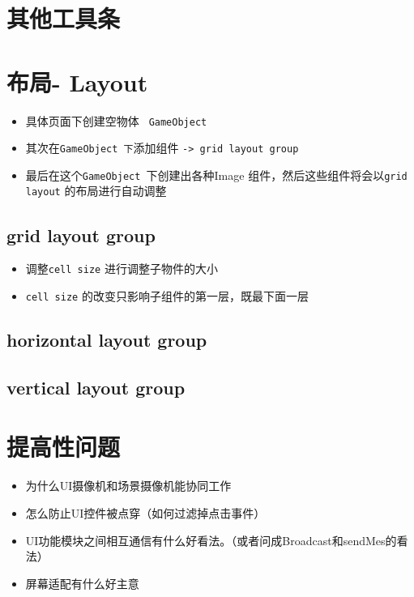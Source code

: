 \documentclass[UTF8,a4paper,12pt]{ctexbook}
\begin{document}
	
	\section{其他工具条}
	
	\section{布局- Layout}
		\begin{itemize}
			\item 具体页面下创建空物体 \verb| GameObject|
			\item 其次在\verb|GameObject 下|添加组件 \verb|-> grid layout group|
			\item 最后在这个\verb|GameObject |下创建出各种Image 组件，然后这些组件将会以\verb|grid layout| 的布局进行自动调整
		\end{itemize}
	
		\subsection{grid layout group}
			\begin{itemize}
				\item  调整\verb|cell size| 进行调整子物件的大小
				\item  \verb|cell size| 的改变只影响子组件的第一层，既最下面一层
			\end{itemize}
		
		\subsection{horizontal layout group}
		
		\subsection{vertical layout group}

	\section{提高性问题}
		\begin{itemize}
			\item 为什么UI摄像机和场景摄像机能协同工作
			\item 怎么防止UI控件被点穿（如何过滤掉点击事件）
			\item UI功能模块之间相互通信有什么好看法。（或者问成Broadcast和sendMes的看法）
			\item 屏幕适配有什么好主意
		\end{itemize}
		
\end{document}
